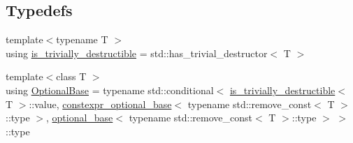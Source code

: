 \subsection*{Typedefs}
\begin{DoxyCompactItemize}
\item 
{\footnotesize template$<$typename T $>$ }\\using \mbox{\hyperlink{namespacestd_1_1experimental_a481cc29b2f00961d0afc189e6e90f739}{is\+\_\+trivially\+\_\+destructible}} = std\+::has\+\_\+trivial\+\_\+destructor$<$ T $>$
\item 
{\footnotesize template$<$class T $>$ }\\using \mbox{\hyperlink{namespacestd_1_1experimental_a33aa5e258a2b0762197365c1ef3f90aa}{Optional\+Base}} = typename std\+::conditional$<$ \mbox{\hyperlink{namespacestd_1_1experimental_a481cc29b2f00961d0afc189e6e90f739}{is\+\_\+trivially\+\_\+destructible}}$<$ T $>$\+::value, \mbox{\hyperlink{structstd_1_1experimental_1_1constexpr__optional__base}{constexpr\+\_\+optional\+\_\+base}}$<$ typename std\+::remove\+\_\+const$<$ T $>$\+::type $>$, \mbox{\hyperlink{structstd_1_1experimental_1_1optional__base}{optional\+\_\+base}}$<$ typename std\+::remove\+\_\+const$<$ T $>$\+::type $>$ $>$\+::type
\end{DoxyCompactItemize}
